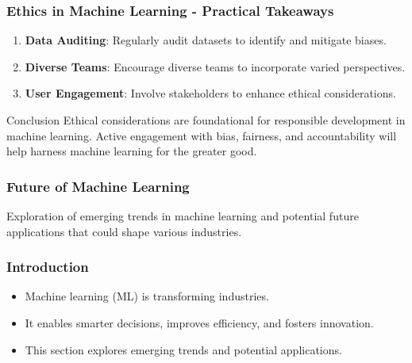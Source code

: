 \documentclass{beamer}
\begin{document}
\begin{frame}[fragile]
    \frametitle{Ethics in Machine Learning - Practical Takeaways}
    \begin{enumerate}
        \item \textbf{Data Auditing}: Regularly audit datasets to identify and mitigate biases.
        \item \textbf{Diverse Teams}: Encourage diverse teams to incorporate varied perspectives.
        \item \textbf{User Engagement}: Involve stakeholders to enhance ethical considerations.
    \end{enumerate}
    
    \begin{block}{Conclusion}
        Ethical considerations are foundational for responsible development in machine learning.
        Active engagement with bias, fairness, and accountability will help harness machine learning for the greater good.
    \end{block}
\end{frame}

\begin{frame}[fragile]
    \frametitle{Future of Machine Learning}
    Exploration of emerging trends in machine learning and potential future applications that could shape various industries.
\end{frame}

\begin{frame}[fragile]
    \frametitle{Introduction}
    \begin{itemize}
        \item Machine learning (ML) is transforming industries.
        \item It enables smarter decisions, improves efficiency, and fosters innovation.
        \item This section explores emerging trends and potential applications.
    \end{itemize}
\end{frame}
\end{document}
